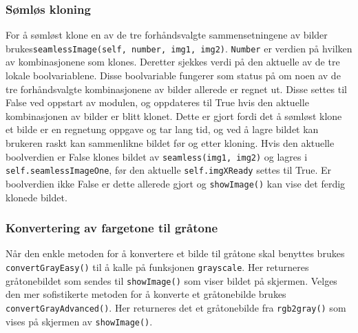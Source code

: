 \subsubsection{Sømløs kloning}
For å sømløst klone en av de tre forhåndsvalgte sammensetningene av bilder brukes\texttt{seamlessImage(self, number, img1, img2)}.
\texttt{Number} er verdien på hvilken av kombinasjonene som klones. Deretter sjekkes verdi på den aktuelle av de tre lokale boolvariablene. Disse boolvariable fungerer som status på om noen av de tre forhåndsvalgte kombinasjonene av bilder allerede er regnet ut. Disse settes til False ved oppstart av modulen, og oppdateres til True hvis den aktuelle kombinasjonen av bilder er blitt klonet. Dette er gjort fordi det å sømløst klone et bilde er en regnetung oppgave og tar lang tid, og ved å lagre bildet kan brukeren raskt kan sammenlikne bildet før og etter kloning. Hvis den aktuelle boolverdien er False klones bildet av \texttt{seamless(img1, img2)} og lagres i \texttt{self.seamlessImageOne}, før den aktuelle \texttt{self.imgXReady} settes til True. Er boolverdien ikke False er dette allerede gjort og \texttt{showImage()} kan vise det ferdig klonede bildet. 

\subsubsection{Konvertering av fargetone til gråtone}
Når den enkle metoden for å konvertere et bilde til gråtone skal benyttes brukes \texttt{convertGrayEasy()} til å kalle på funksjonen \texttt{grayscale}. Her returneres gråtonebildet som sendes til \texttt{showImage()} som viser bildet på skjermen. Velges den mer sofistikerte metoden for å konverte et gråtonebilde brukes \texttt{convertGrayAdvanced()}. Her returneres det et gråtonebilde fra \texttt{rgb2gray()} som vises på skjermen av \texttt{showImage()}.

